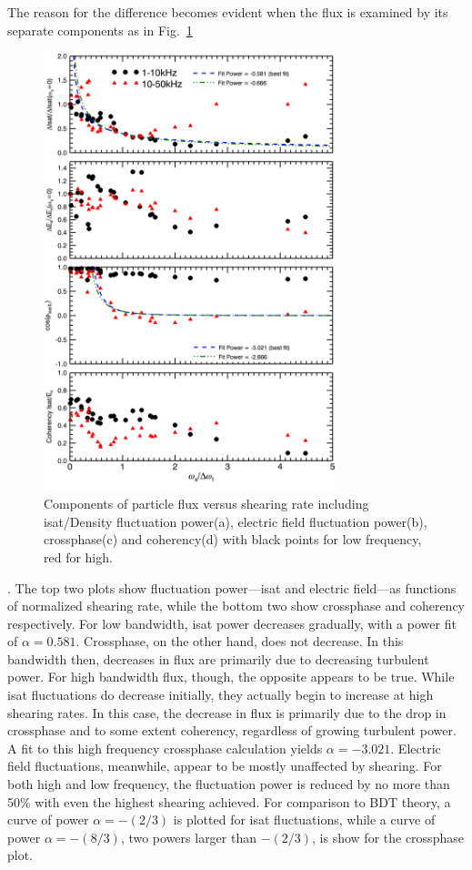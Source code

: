 \documentclass[%
 aps,
 prl,
 amsmath,amssymb,
 reprint,%
]{revtex4-1}
\begin{document}
The reason for the difference becomes evident when the flux is examined by its separate components as in 
Fig.~\ref{fig:fluxcomps}
\begin{figure}
\begin{center}
\includegraphics[width=8.5cm]{fluxcomps.pdf}%
\end{center}
\caption{\label{fig:fluxcomps} Components of particle flux versus shearing rate including isat/Density fluctuation power(a), electric field fluctuation power(b), crossphase(c) and coherency(d) with black points for low frequency, red for high.}
\end{figure}
. The top two plots show fluctuation power---isat and electric field---as functions of normalized shearing rate, while the bottom two show crossphase and coherency respectively. For low bandwidth, isat power decreases gradually, with a power fit of $\alpha = 0.581$. Crossphase, on the other hand, does not decrease. In this bandwidth then, decreases in flux are primarily due to decreasing turbulent power. For high bandwidth flux, though, the opposite appears to be true. While isat fluctuations do decrease initially, they actually begin to increase at high shearing rates. In this case, the decrease in flux is primarily due to the drop in crossphase and to some extent coherency, regardless of growing turbulent power. A fit to this high frequency crossphase calculation yields $\alpha = -3.021$.  Electric field fluctuations, meanwhile, appear to be mostly unaffected by shearing. For both high and low frequency, the fluctuation power is reduced by no more than 50\% with even the highest shearing achieved. For comparison to BDT theory, a curve of power $\alpha = -(2/3)$ is plotted for isat fluctuations, while a curve of power $\alpha = -(8/3)$, two powers larger than $-(2/3)$, is show for the crossphase plot.
\end{document}
